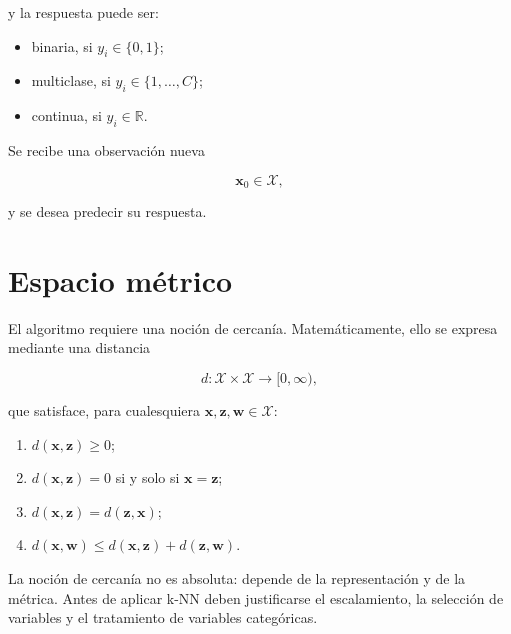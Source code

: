 \documentclass[
  spanish,
  10.5pt,
  letterpaper,
  DIV=11,
  numbers=noendperiod,
  oneside,
  open=any]{scrreprt}
\providecommand{\tightlist}{%
  \setlength{\itemsep}{0pt}\setlength{\parskip}{0pt}}
\theoremstyle{definition}
\theoremstyle{definition}
\theoremstyle{plain}
\theoremstyle{remark}
\begin{document}
y la respuesta puede ser:

\begin{itemize}
\tightlist
\item
  binaria, si \(y_i\in\{0,1\}\);
\item
  multiclase, si \(y_i\in\{1,\ldots,C\}\);
\item
  continua, si \(y_i\in\mathbb{R}\).
\end{itemize}

Se recibe una observación nueva

\[
\mathbf{x}_0\in\mathcal{X},
\]

y se desea predecir su respuesta.

\section*{Espacio métrico}\label{espacio-muxe9trico}


El algoritmo requiere una noción de cercanía. Matemáticamente, ello se
expresa mediante una distancia

\[
d:\mathcal{X}\times\mathcal{X}\to[0,\infty),
\]

que satisface, para cualesquiera
\(\mathbf{x},\mathbf{z},\mathbf{w}\in\mathcal{X}\):

\begin{enumerate}
\def\labelenumi{\arabic{enumi}.}
\tightlist
\item
  \(d(\mathbf{x},\mathbf{z})\ge 0\);
\item
  \(d(\mathbf{x},\mathbf{z})=0\) si y solo si \(\mathbf{x}=\mathbf{z}\);
\item
  \(d(\mathbf{x},\mathbf{z})=d(\mathbf{z},\mathbf{x})\);
\item
  \(d(\mathbf{x},\mathbf{w})\le d(\mathbf{x},\mathbf{z})+d(\mathbf{z},\mathbf{w})\).
\end{enumerate}

\begin{tcolorbox}[enhanced jigsaw, arc=.35mm, bottomrule=.15mm, bottomtitle=1mm, breakable, colback=white, colbacktitle=quarto-callout-important-color!10!white, colframe=quarto-callout-important-color-frame, coltitle=black, left=2mm, leftrule=.75mm, opacityback=0, opacitybacktitle=0.6, rightrule=.15mm, title=\textcolor{quarto-callout-important-color}{\faExclamation}\hspace{0.5em}{Escala y geometría}, titlerule=0mm, toprule=.15mm, toptitle=1mm]

La noción de cercanía no es absoluta: depende de la representación y de
la métrica. Antes de aplicar k-NN deben justificarse el escalamiento, la
selección de variables y el tratamiento de variables categóricas.

\end{tcolorbox}
\end{document}

